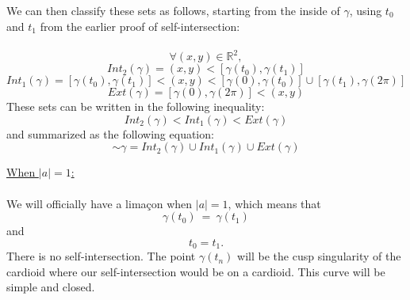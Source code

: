\documentclass[12pt]{article}
\begin{document}
  We can then classify these sets as follows, starting from the inside of $\gamma$, using $t_0$ and $t_1$ from the earlier proof of self-intersection:\\\\
  $$
\forall (x,y) \in \mathbb{R}^2,
  $$
  $$
  Int_2(\gamma) = (x,y) < [\gamma(t_0),\gamma(t_1)]
  $$
  $$
  Int_1(\gamma) = [\gamma(t_0),\gamma(t_1)] < (x,y) < [\gamma(0),\gamma(t_0)] \cup [\gamma(t_1),\gamma(2\pi)]
  $$
    $$
  Ext(\gamma) = [\gamma(0),\gamma(2\pi)] < (x,y)
  $$
  \clearpage
These sets can be written in the following inequality:
$$
Int_2(\gamma) < Int_1(\gamma) < Ext(\gamma)
$$
and summarized as the following equation:
$$
\sim\gamma=Int_2(\gamma) \cup Int_1(\gamma) \cup Ext(\gamma)
$$

\noindent
\underline{When $|a| = 1$:}\\\\
\indent
We will officially have a limaçon when $|a| = 1$, which means that\\
$$
\gamma(t_0) \ = \ \gamma(t_1)
$$
and
$$t_0 = t_1.$$ 
There is no self-intersection. The point $\gamma(t_n)$ will be the cusp singularity of the cardioid where our self-intersection would be on a cardioid. This curve will be simple and closed.\\
  
\end{document}

